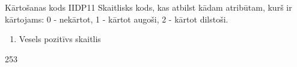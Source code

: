 \parameterTable
{Kārtošanas kods}
{IIDP11}
{
	Skaitlisks kods, kas atbilst kādam atribūtam, kurš ir kārtojams: 0 - nekārtot, 1 - kārtot augoši, 2 - kārtot dilstoši.
}
{
	\begin{enumerate}
		\item Vesels pozitīvs skaitlis
	\end{enumerate}
}
{
	253
}
